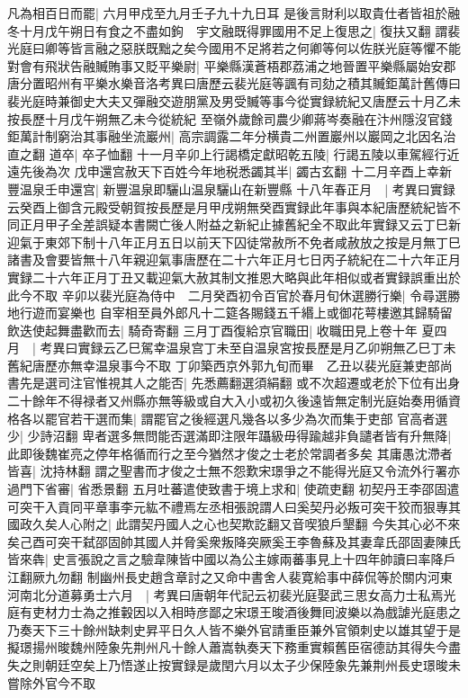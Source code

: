 凡為相百日而罷|{
	六月甲戍至九月壬子九十九日耳}
是後言財利以取貴仕者皆祖於融　冬十月戊午朔日有食之不盡如鉤　宇文融既得罪國用不足上復思之|{
	復扶又翻}
謂裴光庭曰卿等皆言融之惡朕既黜之矣今國用不足將若之何卿等何以佐朕光庭等懼不能對會有飛狀告融贓賄事又貶平樂尉|{
	平樂縣漢蒼梧郡荔浦之地晉置平樂縣屬始安郡唐分置昭州有平樂水樂音洛考異曰唐歷云裴光庭等諷有司劾之積其贓鉅萬計舊傳曰裴光庭時兼御史大夫又彈融交遊朋黨及男受贓等事今從實録統紀又唐歷云十月乙未按長歷十月戊午朔無乙未今從統紀}
至嶺外歲餘司農少卿蔣岑奏融在汴州隱沒官錢鉅萬計制窮治其事融坐流巖州|{
	高宗調露二年分横貴二州置巖州以巖岡之北因名治直之翻}
道卒|{
	卒子恤翻}
十一月辛卯上行謁橋定獻昭乾五陵|{
	行謁五陵以車駕經行近遠先後為次}
戊申還宫赦天下百姓今年地税悉蠲其半|{
	蠲古玄翻}
十二月辛酉上幸新豐温泉壬申還宫|{
	新豐温泉即驪山温泉驪山在新豐縣}
十八年春正月　|{
	考異曰實録云癸酉上御含元殿受朝賀按長歷是月甲戌朔無癸酉實録此年事與本紀唐歷統紀皆不同正月甲子全差誤疑本書闕亡後人附益之新紀止據舊紀全不取此年實録又云丁巳新迎氣于東郊下制十八年正月五日以前天下囚徒常赦所不免者咸赦放之按是月無丁巳諸書及會要皆無十八年親迎氣事唐歷在二十六年正月七日丙子統紀在二十六年正月實録二十六年正月丁丑又載迎氣大赦其制文推恩大略與此年相似或者實録誤重出於此今不取}
辛卯以裴光庭為侍中　二月癸酉初令百官於春月旬休選勝行樂|{
	令尋選勝地行遊而宴樂也}
自宰相至員外郎凡十二筵各賜錢五千緡上或御花萼樓邀其歸騎留飲迭使起舞盡歡而去|{
	騎奇寄翻}
三月丁酉復給京官職田|{
	收職田見上卷十年}
夏四月　|{
	考異曰實録云乙巳駕幸温泉宫丁未至自温泉宮按長歷是月乙卯朔無乙巳丁未舊紀唐歷亦無幸温泉事今不取}
丁卯築西京外郭九旬而畢　乙丑以裴光庭兼吏部尚書先是選司注官惟視其人之能否|{
	先悉薦翻選須絹翻}
或不次超遷或老於下位有出身二十餘年不得禄者又州縣亦無等級或自大入小或初久後遠皆無定制光庭始奏用循資格各以罷官若干選而集|{
	謂罷官之後經選凡幾各以多少為次而集于吏部}
官高者選少|{
	少詩沼翻}
卑者選多無問能否選滿即注限年躡級毋得踰越非負譴者皆有升無降|{
	此即後魏崔亮之停年格循而行之至今猶然才俊之士老於常調者多矣}
其庸愚沈滯者皆喜|{
	沈持林翻}
謂之聖書而才俊之士無不怨歎宋璟爭之不能得光庭又令流外行署亦過門下省審|{
	省悉景翻}
五月吐蕃遣使致書于境上求和|{
	使疏吏翻}
初契丹王李邵固遣可突干入貢同平章事李元紘不禮焉左丞相張說謂人曰奚契丹必叛可突干狡而狠專其國政久矣人心附之|{
	此謂契丹國人之心也契欺訖翻又音喫狼戶墾翻}
今失其心必不來矣己酉可突干弑邵固帥其國人并脅奚衆叛降突厥奚王李魯蘇及其妻韋氏邵固妻陳氏皆來犇|{
	史言張說之言之驗韋陳皆中國以為公主嫁兩蕃事見上十四年帥讀曰率降戶江翻厥九勿翻}
制幽州長史趙含章討之又命中書舍人裴寛給事中薛侃等於關内河東河南北分道募勇士六月　|{
	考異曰唐朝年代記云初裴光庭娶武三思女高力士私焉光庭有吏材力士為之推轂因以入相時彦鄙之宋璟王晙酒後舞囘波樂以為戲謔光庭患之乃奏天下三十餘州缺刺史昇平日久人皆不樂外官請重臣兼外官領刺史以雄其望于是擬璟揚州晙魏州陸象先荆州凡十餘人蕭嵩執奏天下務重實賴舊臣宿德訪其得失今盡失之則朝廷空矣上乃悟遂止按實録是歲閏六月以太子少保陸象先兼荆州長史璟晙未嘗除外官今不取}
